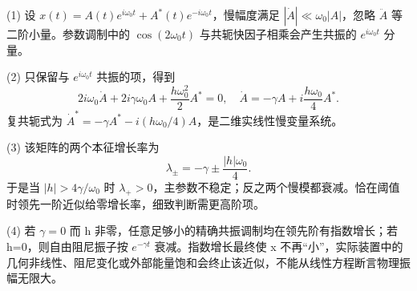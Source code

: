 (1) 设 \(x(t)=A(t)e^{i\omega_0t}+A^*(t)e^{-i\omega_0t}\)，慢幅度满足 \(|\dot A|\ll\omega_0|A|\)，忽略 \(\ddot A\) 等二阶小量。参数调制中的 \(\cos(2\omega_0t)\) 与共轭快因子相乘会产生共振的 \(e^{i\omega_0t}\) 分量。

(2) 只保留与 \(e^{i\omega_0t}\) 共振的项，得到
\[
2i\omega_0\dot A+2i\gamma\omega_0A+\frac{h\omega_0^2}{2}A^*=0,
\quad
\dot A=-\gamma A+i\frac{h\omega_0}{4}A^*.
\]
复共轭式为 \(\dot A^*=-\gamma A^*-i(h\omega_0/4)A\)，是二维实线性慢变量系统。

(3) 该矩阵的两个本征增长率为
\[
\lambda_\pm=-\gamma\pm\frac{|h|\omega_0}{4}.
\]
于是当 \(|h|>4\gamma/\omega_0\) 时 \(\lambda_+>0\)，主参数不稳定；反之两个慢模都衰减。恰在阈值时领先一阶近似给零增长率，细致判断需更高阶项。

(4) 若 \(\gamma=0\) 而 h 非零，任意足够小的精确共振调制均在领先阶有指数增长；若 h=0，则自由阻尼振子按 \(e^{-\gamma t}\) 衰减。指数增长最终使 x 不再“小”，实际装置中的几何非线性、阻尼变化或外部能量饱和会终止该近似，不能从线性方程断言物理振幅无限大。

